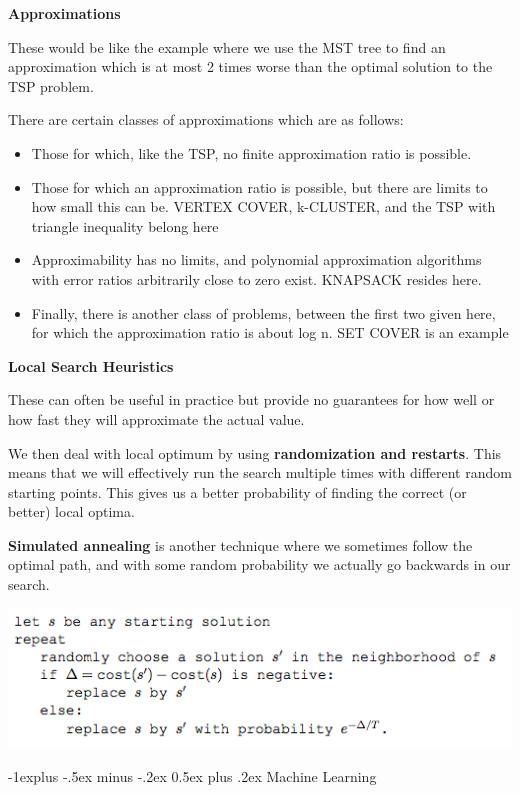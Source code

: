 \documentclass[landscape]{article}
\makeatletter
\renewcommand{\subsection}{\@startsection{subsection}{2}{0mm}%
                            {-1explus -.5ex minus -.2ex}%
                            {0.5ex plus .2ex}%
                            {\normalfont\normalsize\bfseries}}
\makeatother
\begin{document}
\begin{multicols}{3}
\textbf{Approximations}


These would be like the example where we use the MST tree to find an approximation which is at most 2 times worse than the optimal solution to the TSP problem.

There are certain classes of approximations which are as follows:

\begin{itemize}
	\item Those for which, like the TSP, no finite approximation ratio is possible.
	\item Those for which an approximation ratio is possible, but there are limits to how small
this can be. VERTEX COVER, k-CLUSTER, and the TSP with triangle inequality belong here
	\item Approximability has no limits, and polynomial approximation algorithms with error ratios arbitrarily close to zero exist. KNAPSACK resides here.
	\item Finally, there is another class of problems, between the first two given here, for which
the approximation ratio is about log n. SET COVER is an example
\end{itemize}

\textbf{Local Search Heuristics}

These can often be useful in practice but provide no guarantees for how well or how fast they will approximate the actual value.

We then deal with local optimum by using \textbf{randomization and restarts}.
This means that we will effectively run the search multiple times with different random starting points.
This gives us a better probability of finding the correct (or better) local optima.

\textbf{Simulated annealing} is another technique where we sometimes follow the optimal path, and with some random probability we actually go backwards in our search.

\includegraphics[scale=0.45]{annealing}



\subsection{Machine Learning}


\end{multicols}
\end{document}
